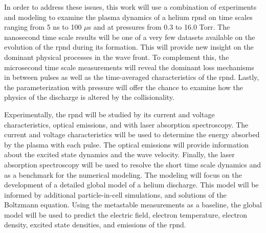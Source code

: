 In order to address these issues, this work will use a combination of
experiments and modeling to examine the plasma dynamics of a helium \acs{rpnd}
on time scales ranging from 5 ns to 100 $\mu$s and at pressures from 0.3 to 16.0
Torr. The nanosecond time scale results will be one of a very few datasets
available on the evolution of the \acs{rpnd} during its formation. This will
provide new insight on the dominant physical processes in the wave front. To
complement this, the microsecond time scale measurements will reveal the
dominant loss mechanisms in between pulses as well as the time-averaged
characteristics of the \acs{rpnd}. Lastly, the parameterization with pressure
will offer the chance to examine how the physics of the discharge is altered by
the collisionality.

Experimentally, the \acs{rpnd} will be studied by its current and voltage
characteristics, optical emissions, and with laser absorption spectroscopy. The
current and voltage characteristics will be used to determine the energy
absorbed by the plasma with each pulse. The optical emissions will provide
information about the excited state dynamics and the wave velocity. Finally, the
laser absorption spectroscopy will be used to resolve the short time scale
dynamics and as a benchmark for the numerical modeling. The modeling will focus
on the development of a detailed global model of a helium discharge. This model
will be informed by additional particle-in-cell simulations, and solutions of
the Boltzmann equation. Using the metastable measurements as a baseline, the
global model will be used to predict the electric field, electron temperature,
electron density, excited state densities, and emissions of the \acs{rpnd}.
